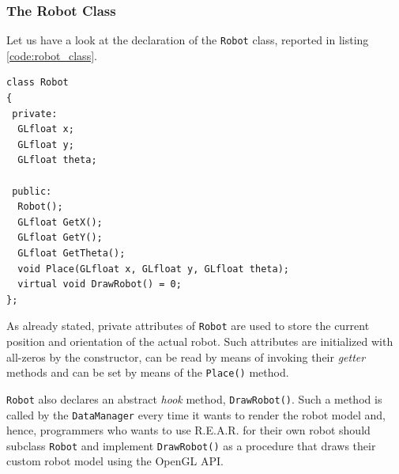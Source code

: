 \subsubsection{The Robot Class}
\label{sub:robotclass}
Let us have a look at the declaration of the \texttt{Robot}
class, reported in listing \ref{code:robot_class}.
%
\begin{lstlisting}[caption={\texttt{Robot} class declaration}, label={code:robot_class}, frame=trBL]
class Robot
{
 private:
  GLfloat x;
  GLfloat y;					
  GLfloat theta;

 public:
  Robot();
  GLfloat GetX();
  GLfloat GetY();
  GLfloat GetTheta();
  void Place(GLfloat x, GLfloat y, GLfloat theta);
  virtual void DrawRobot() = 0;
};
\end{lstlisting}
%
As already stated, private attributes of \texttt{Robot} 
are used to store the current position and orientation 
of the actual robot. Such attributes are initialized with 
all-zeros by the constructor, can be read by means 
of invoking their \textit{getter} methods and can be set 
by means of the \texttt{Place()} method.
%

%
\texttt{Robot} also declares an abstract \textit{hook} method, 
\texttt{DrawRobot()}. Such a method is called by the 
\texttt{DataManager} every time it wants to render the 
robot model and, hence, programmers who wants to 
use \textsf{R.E.A.R.} for their own robot should subclass 
\texttt{Robot} and implement \texttt{DrawRobot()} as a 
procedure that draws their custom robot model using 
the OpenGL API.
%

%

%

%

